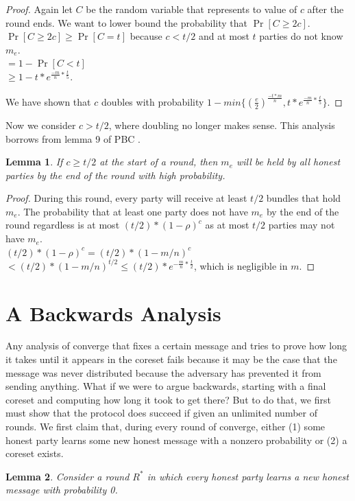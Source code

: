 \documentclass{article}
\newtheorem{lemma}{Lemma}
\begin{document}
\begin{proof}
Again let $C$ be the random variable that represents to value of $c$ after the round ends. We want to lower bound the probability that $\Pr[C \geq 2c]$.\\
$\Pr[C \geq 2c] \geq \Pr[C = t]$ because $c < t/2$ and at most $t$ parties do not know $m_e$.\\
$= 1 - \Pr[C < t]$\\
$\geq 1 - t*e^{\frac{-m}{n} * \frac{t}{5}}$.

We have shown that $c$ doubles with probability $1 - min\{(\frac{e}{2})^{\frac{-t*m}n} , t*e^{\frac{-m}{n} * \frac{t}{5}}\}$.
\end{proof}

Now we consider $c > t/2$, where doubling no longer makes sense. This analysis borrows from lemma 9 of PBC \cite{PBC}.
\begin{lemma}
If $c \geq t/2$ at the start of a round, then $m_e$ will be held by all honest parties by the end of the round with high probability.
\end{lemma}
\begin{proof}
During this round, every party will receive at least $t/2$ bundles that hold $m_e$. The probability that at least one party does not have $m_e$ by the end of the round regardless is at most $(t/2) * (1 - \rho)^c$ as at most $t/2$ parties may not have $m_e$.\\
 $(t/2) * (1 - \rho)^c = (t/2) * (1 - m/n)^c$\\
 $< (t/2) * (1 - m/n)^{t/2} \leq (t/2) * e^{-\frac m n * \frac t 2}$, which is negligible in $m$.
\end{proof}

\section{A Backwards Analysis}
Any analysis of converge that fixes a certain message and tries to prove how long it takes until it appears in the coreset fails because it may be the case that the message was never distributed because the adversary has prevented it from sending anything. What if we were to argue backwards, starting with a final coreset and computing how long it took to get there? But to do that, we first must show that the protocol does succeed if given an unlimited number of rounds. We first claim that, during every round of converge, either (1) some honest party learns some new honest message with a nonzero probability or (2) a coreset exists.

\begin{lemma}
Consider a round $R^*$ in which every honest party learns a new honest message with probability 0.
\end{lemma}
\end{document}

